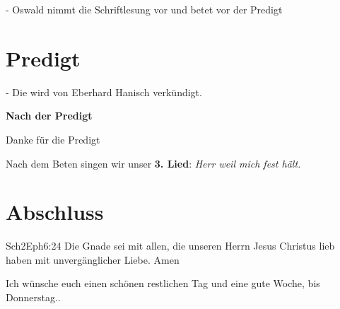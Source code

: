 \documentclass[12pt,a4paper]{scrarticle}
\begin{document}
- Oswald nimmt die Schriftlesung vor und betet vor der Predigt

\section{Predigt}
- Die wird von Eberhard Hanisch verkündigt.

\textbf{Nach der Predigt}

Danke für die Predigt

Nach dem Beten singen wir unser \textbf{3. Lied}: \textit{Herr weil mich fest hält.}\\

\section{Abschluss}

\begin{bibeltext}{Sch2}{Eph}{6:24}
Die Gnade sei mit allen, die unseren Herrn Jesus Christus lieb haben mit unvergänglicher Liebe. Amen
\end{bibeltext}

Ich wünsche euch einen schönen restlichen Tag und eine gute Woche, bis Donnerstag..
\end{document}
